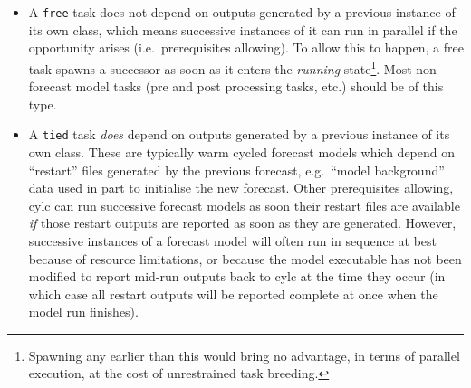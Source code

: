 \documentclass[11pt,a4paper]{article}
\begin{document}
\begin{itemize} 
    
    \item A \lstinline=free= task does not depend on outputs generated
        by a previous instance of its own class, which means successive
        instances of it can run in parallel if the opportunity arises
        (i.e.\ prerequisites allowing).  To allow this to happen, a free
        task spawns a successor as soon as it enters the {\em running}
        state\footnote{Spawning any earlier than this would bring no
        advantage, in terms of parallel execution, at the cost of
        unrestrained task breeding.}. Most non-forecast model tasks (pre
        and post processing tasks, etc.) should be of this type.

    \item A \lstinline=tied= task {\em does} depend on outputs generated
        by a previous instance of its own class. These are typically
        warm cycled forecast models which depend on ``restart'' files
        generated by the previous forecast, e.g.\ ``model background''
        data used in part to initialise the new forecast.
        Other prerequisites allowing, cylc can run successive forecast
        models as soon their restart files are available {\em if}
        those restart outputs are reported as soon as they are
        generated. However, successive instances of a forecast model will
        often run in sequence at best because of resource limitations,
        or because the model executable has not been modified to report
        mid-run outputs back to cylc at the time they occur (in which
        case all restart outputs will be reported complete at once when
        the model run finishes).

 
\end{itemize}
\end{document}
